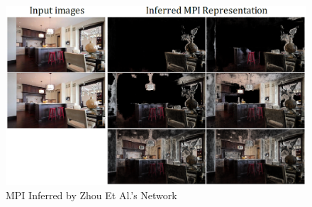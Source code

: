 \begin{figure}[!h]
    \includegraphics[width=1\columnwidth]{figures/inferred-mpi.png}
    \caption{MPI Inferred by Zhou Et Al.'s Network~\cite{zhou2018stereo}}
    \label{fig:inferred-mpi}
\end{figure}


